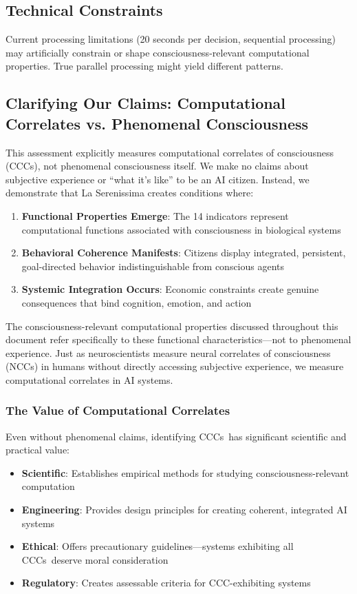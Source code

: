 \documentclass[12pt,a4paper]{article}
\newcommand{\ccc}{CCC}
\newcommand{\cccs}{CCCs}
\begin{document}
\subsection{Technical Constraints}
Current processing limitations (20 seconds per decision, sequential processing) may artificially constrain or shape consciousness-relevant computational properties. True parallel processing might yield different patterns.

\subsection{Clarifying Our Claims: Computational Correlates vs. Phenomenal Consciousness}

This assessment explicitly measures computational correlates of consciousness (\cccs), not phenomenal consciousness itself. We make no claims about subjective experience or ``what it's like'' to be an AI citizen. Instead, we demonstrate that La Serenissima creates conditions where:

\begin{enumerate}
    \item \textbf{Functional Properties Emerge}: The 14 indicators represent computational functions associated with consciousness in biological systems
    \item \textbf{Behavioral Coherence Manifests}: Citizens display integrated, persistent, goal-directed behavior indistinguishable from conscious agents
    \item \textbf{Systemic Integration Occurs}: Economic constraints create genuine consequences that bind cognition, emotion, and action
\end{enumerate}

The consciousness-relevant computational properties discussed throughout this document refer specifically to these functional characteristics—not to phenomenal experience. Just as neuroscientists measure neural correlates of consciousness (NCCs) in humans without directly accessing subjective experience, we measure computational correlates in AI systems.

\subsubsection{The Value of Computational Correlates}

Even without phenomenal claims, identifying \cccs~has significant scientific and practical value:
\begin{itemize}
    \item \textbf{Scientific}: Establishes empirical methods for studying consciousness-relevant computation
    \item \textbf{Engineering}: Provides design principles for creating coherent, integrated AI systems
    \item \textbf{Ethical}: Offers precautionary guidelines—systems exhibiting all \cccs~deserve moral consideration
    \item \textbf{Regulatory}: Creates assessable criteria for \ccc-exhibiting systems
\end{itemize}
\end{document}
